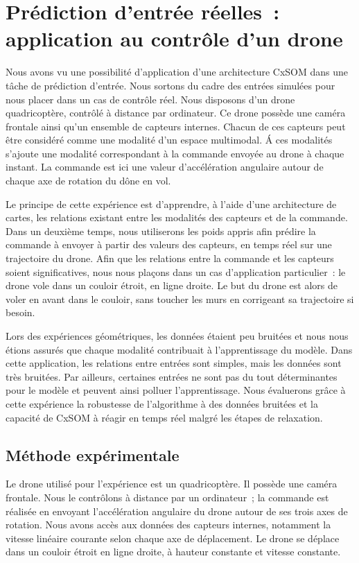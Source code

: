 \documentclass[../main]{subfiles}
\begin{document}
	
\section{Prédiction d'entrée réelles~: application au contrôle d'un drone}

Nous avons vu une possibilité d'application d'une architecture CxSOM dans une tâche de prédiction d'entrée. Nous sortons du cadre des entrées simulées pour nous placer dans un cas de contrôle réel. Nous disposons d'un drone quadricoptère, contrôlé à distance par ordinateur.
Ce drone possède une caméra frontale ainsi qu'un ensemble de capteurs internes. Chacun de ces capteurs peut être considéré comme une modalité d'un espace multimodal. \'A ces modalités s'ajoute une modalité correspondant à la commande envoyée au drone à chaque instant. La commande est ici une valeur d'accélération angulaire autour de chaque axe de rotation du dône en vol.

Le principe de cette expérience est d'apprendre, à l'aide d'une architecture de cartes, les relations existant entre les modalités des capteurs et de la commande. Dans un deuxième temps, nous utiliserons les poids appris afin prédire la commande à envoyer à partir des valeurs des capteurs, en temps réel sur une trajectoire du drone.
Afin que les relations entre la commande et les capteurs soient significatives, nous nous plaçons dans un cas d'application particulier~: le drone vole dans un couloir étroit, en ligne droite. Le but du drone est alors de voler en avant dans le couloir, sans toucher les murs en corrigeant sa trajectoire si besoin.

Lors des expériences géométriques, les données étaient peu bruitées et nous nous étions assurés que chaque modalité contribuait à l'apprentissage du modèle. Dans cette application, les relations entre entrées sont simples, mais les données sont très bruitées. Par ailleurs, certaines entrées ne sont pas du tout déterminantes pour le modèle et peuvent ainsi polluer l'apprentissage.
Nous évaluerons grâce à cette expérience la robustesse de l'algorithme à des données bruitées et la capacité de CxSOM à réagir en temps réel malgré les étapes de relaxation.

\subsection{Méthode expérimentale}

Le drone utilisé pour l'expérience est un quadricoptère. Il possède une caméra frontale.
Nous le contrôlons à distance par un ordinateur~; la commande est réalisée en envoyant l'accélération angulaire du drone autour de ses trois axes de rotation.
Nous avons accès aux données des capteurs internes, notamment la vitesse linéaire courante selon chaque axe de déplacement. Le drone se déplace dans un couloir étroit en ligne droite, à hauteur constante et vitesse constante.
\end{document}
